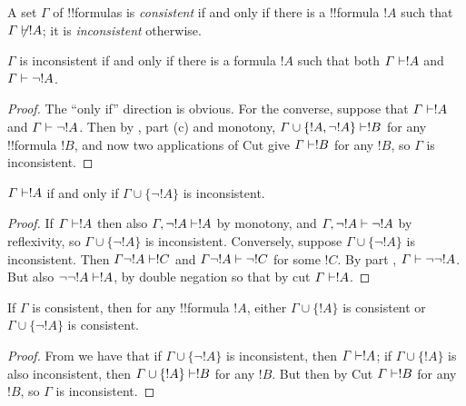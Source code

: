 \documentclass[../../include/open-logic-section]{subfiles}
\begin{document}
\begin{defn}[Consistency]
A set $\Gamma$ of !!{formula}s is \emph{consistent} if and only if
there is a !!{formula} $!A$ such that $\Gamma \Proves/ !A$; it is
\emph{inconsistent} otherwise.
\end{defn}

\begin{prop}
$\Gamma$ is inconsistent if and only if there is a formula $!A$ such
  that both $\Gamma \Proves !A$ and $\Gamma \Proves \lnot !A$.
\end{prop}

\begin{proof}
The ``only if'' direction is obvious. For the converse, suppose that
$\Gamma \Proves !A$ and $\Gamma\Proves\lnot !A$. Then by
, part (c) and monotony, $\Gamma \cup
\{!A,\lnot!A \} \Proves !B$ for any !!{formula} $!B$, and now two
applications of Cut give $\Gamma\Proves!B$ for any $!B$, so $\Gamma$
is inconsistent.
\end{proof}

\begin{prop}
$\Gamma \Proves!A$ if and only if $\Gamma\cup \{\lnot!A \}$ is
inconsistent.
\end{prop}

\begin{proof}
If $\Gamma \Proves !A$ then also $\Gamma, \lnot !A \Proves !A$ by
monotony, and $\Gamma, \lnot !A \Proves \lnot !A$ by reflexivity, so
$\Gamma\cup\{\lnot !A\}$ is inconsistent.  Conversely, suppose
$\Gamma\cup\{\lnot !A\}$ is inconsistent. Then $\Gamma \lnot !A
\Proves !C$ and $\Gamma \lnot !A \Proves \lnot !C$ for some $!C$. By
 part , $\Gamma
\Proves \lnot \lnot !A$. But also $\lnot\lnot!A \Proves !A$, by double
negation so that by cut $\Gamma \Proves !A$.
\end{proof}

\begin{prop}
If $\Gamma$ is consistent, then for any !!{formula} $!A$, either
$\Gamma \cup\{!A\}$ is consistent or $\Gamma \cup\{\lnot !A\}$ is
consistent.
\end{prop}

\begin{proof}
From  we have that if $\Gamma \cup \{\lnot !A\}$ is
inconsistent, then $\Gamma \Proves !A$; if $\Gamma \cup \{ !A\}$ is
also inconsistent, then $\Gamma \cup \{!A\} \Proves !B$ for any
$!B$. But then by Cut $\Gamma \Proves !B$ for any $!B$, so $\Gamma$ is
inconsistent.
\end{proof}
\end{document}
